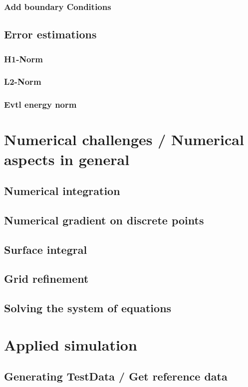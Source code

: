 \documentclass[parskip=half, titlepage=yes, 12pt, BCOR=12mm, DIV=calc]{scrartcl}
\begin{document}
\subsubsection{Add boundary Conditions}

\subsection{Error estimations}
\subsubsection{H1-Norm}
\subsubsection{L2-Norm}
\subsubsection{Evtl energy norm}

\newpage


\section{Numerical challenges / Numerical aspects in general}
\subsection{Numerical integration}
\subsection{Numerical gradient on discrete points}
\subsection{Surface integral}
\subsection{Grid refinement}
\subsection{Solving the system of equations}

\section{Applied simulation}
\subsection{Generating TestData / Get reference data}
\end{document}
